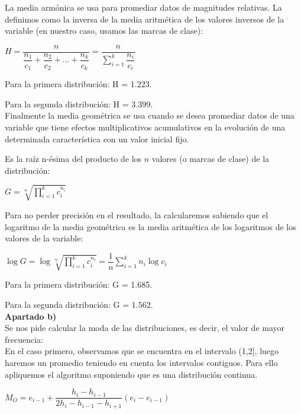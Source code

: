 La media armónica se usa para promediar datos de magnitudes relativas. La definimos como la inversa de la media aritmética de los valores inversos de la variable (en nuestro caso, usamos las marcas de clase):
\begin{center}
	$H = \dfrac{n}{\dfrac{n_1}{c_1}+\dfrac{n_2}{c_2}+ ...+\dfrac{n_k}{c_k}} = \dfrac{n}{\sum_{i=1}^{k}\dfrac{n_i}{c_i}}$
\end{center}

Para la primera distribución: H = 1.223.

Para la segunda distribución: H = 3.399.  \\


Finalmente la media geométrica se usa cuando se desea promediar datos de una variable que tiene efectos
multiplicativos acumulativos en la evolución de una determinada característica con un
valor inicial fijo.

Es la raíz n-ésima del producto de los $n$ valores (o marcas de clase) de la distribución:

\begin{center}
	$G = \sqrt[n]{\prod_{i=1}^{k}c_i^{n_i}}$
\end{center}

Para no perder precisión en el resultado, la calcularemos sabiendo que el logaritmo de la media geométrica es la media aritmética de los logaritmos de los valores de la variable:

\begin{center}
	$\log G = \log \sqrt[n]{\prod_{i=1}^{k}c_i^{n_i}} = \dfrac{1}{n}\sum_{i=1}^{k}n_i \log c_i$
\end{center}

Para la primera distribución: G = 1.685.

Para la segunda distribución: G = 1.562.  \\


\textbf{Apartado b)}\\

Se nos pide calcular la moda de las distribuciones, es decir, el valor  de mayor frecuencia: \\

En el caso primero, observamos que se encuentra en el intervalo (1,2], luego haremos un promedio teniendo en cuenta los intervalos contiguos. Para ello apliquemos el algoritmo suponiendo que es una distribución continua.

\begin{center}
	$M_O = e_{i-1} + \dfrac{h_i - h_{i-1}}{2h_i - h_{i-1} - h_{i+1}} (e_i - e_{i-1})$
\end{center}


